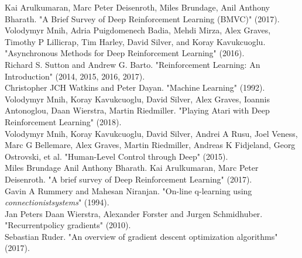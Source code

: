 \begin{thebibliography}{69}


 Kai Arulkumaran, Marc Peter Deisenroth, Miles Brundage, Anil Anthony Bharath. "A Brief Survey of Deep Reinforcement Learning (BMVC)" (2017).\\

 Volodymyr Mnih, Adria Puigdomenech Badia, Mehdi Mirza, Alex Graves, Timothy P Lillicrap, Tim Harley, David Silver, and Koray Kavukcuoglu. "Asynchronous Methods for Deep Reinforcement Learning" (2016).\\

 Richard S. Sutton and Andrew G. Barto. "Reinforcement Learning: An Introduction" (2014, 2015, 2016, 2017).\\

 Christopher JCH Watkins and Peter Dayan. "Machine Learning"  (1992).\\

 Volodymyr Mnih, Koray Kavukcuoglu, David Silver, Alex Graves, Ioannis Antonoglou, Daan Wierstra, Martin Riedmiller. "Playing Atari with Deep Reinforcement Learning" (2018).\\

 Volodymyr Mnih, Koray Kavukcuoglu, David Silver, Andrei A Rusu, Joel Veness, Marc G Bellemare, Alex Graves, Martin Riedmiller, Andreas K Fidjeland, Georg Ostrovski, et al. "Human-Level Control through Deep" (2015).\\

 Miles Brundage Anil Anthony Bharath. Kai Arulkumaran, Marc Peter Deisenroth. "A brief survey of Deep Reinforcement Learning" (2017).\\

 Gavin A Rummery and Mahesan Niranjan. "On-line q-learning using \textit{connectionistsystems}" (1994).\\

 Jan Peters Daan Wierstra, Alexander Forster and Jurgen Schmidhuber. "Recurrentpolicy gradients" (2010).\\

 Sebastian Ruder. "An overview of gradient descent optimization algorithms" (2017).\\


\end{thebibliography}
